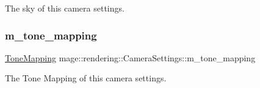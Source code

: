 The sky of this camera settings. \hypertarget{classmage_1_1rendering_1_1_camera_settings_a5a88df673aa475c5087bf74620048580}{}\label{classmage_1_1rendering_1_1_camera_settings_a5a88df673aa475c5087bf74620048580} 
\subsubsection{\texorpdfstring{m\+\_\+tone\+\_\+mapping}{m\_tone\_mapping}}
{\footnotesize\ttfamily \hyperlink{namespacemage_1_1rendering_a789e4b7d9a8cc831b065e9c6bb7430e9}{Tone\+Mapping} mage\+::rendering\+::\+Camera\+Settings\+::m\+\_\+tone\+\_\+mapping\hspace{0.3cm}{\ttfamily [private]}}

The Tone Mapping of this camera settings. 